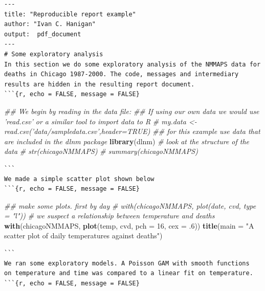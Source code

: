 \documentclass[11pt,a4paper]{article}
\newenvironment{Shaded}{\begin{snugshade}}{\end{snugshade}}
\newcommand{\KeywordTok}[1]{\textcolor[rgb]{0.13,0.29,0.53}{\textbf{{#1}}}}
\newcommand{\DataTypeTok}[1]{\textcolor[rgb]{0.13,0.29,0.53}{{#1}}}
\newcommand{\DecValTok}[1]{\textcolor[rgb]{0.00,0.00,0.81}{{#1}}}
\newcommand{\StringTok}[1]{\textcolor[rgb]{0.31,0.60,0.02}{{#1}}}
\newcommand{\CommentTok}[1]{\textcolor[rgb]{0.56,0.35,0.01}{\textit{{#1}}}}
\newcommand{\NormalTok}[1]{{#1}}
\begin{document}
\begin{small}
\begin{singlespace}
\begin{Shaded}
\begin{BVerbatim}
---
title: "Reproducible report example"
author: "Ivan C. Hanigan"
output:  pdf_document
---
# Some exploratory analysis
In this section we do some exploratory analysis of the NMMAPS data for
deaths in Chicago 1987-2000. The code, messages and intermediary
results are hidden in the resulting report document.
```{r, echo = FALSE, message = FALSE}
\end{BVerbatim}
\begin{Shaded}
\begin{Highlighting}[]
\CommentTok{## We begin  by reading in the data file:}
\CommentTok{## If using our own data we would use 'read.csv' or a similar tool to import data to R}
\CommentTok{# my.data <- read.csv('data/sampledata.csv',header=TRUE)}
\CommentTok{## for this example use data that are included in the dlnm package}
\KeywordTok{library}\NormalTok{(dlnm)}
\CommentTok{# look at the structure of the data}
\CommentTok{# str(chicagoNMMAPS)}
\CommentTok{# summary(chicagoNMMAPS)}
\end{Highlighting}
\end{Shaded}
\begin{BVerbatim}
```
We made a simple scatter plot shown below
```{r, echo = FALSE, message = FALSE}
\end{BVerbatim}
\begin{Shaded}
\begin{Highlighting}[]
\CommentTok{## make some plots. first by day}
\CommentTok{# with(chicagoNMMAPS, plot(date, cvd, type = "l"))}
\CommentTok{# we suspect a relationship between temperature and deaths}
\KeywordTok{with}\NormalTok{(chicagoNMMAPS, }\KeywordTok{plot}\NormalTok{(temp, cvd, }\DataTypeTok{pch =} \DecValTok{16}\NormalTok{, }\DataTypeTok{cex =} \NormalTok{.}\DecValTok{6}\NormalTok{))}
\KeywordTok{title}\NormalTok{(}\DataTypeTok{main =} \StringTok{"A scatter plot of daily temperatures against deaths"}\NormalTok{)}
\end{Highlighting}
\end{Shaded}
\begin{BVerbatim}
```
We ran some exploratory models. A Poisson GAM with smooth functions
on temperature and time was compared to a linear fit on temperature.
```{r, echo = FALSE, message = FALSE}
\end{BVerbatim}
\begin{Shaded}

\end{Shaded}
\end{Shaded}
\end{singlespace}
\end{small}
\end{document}
